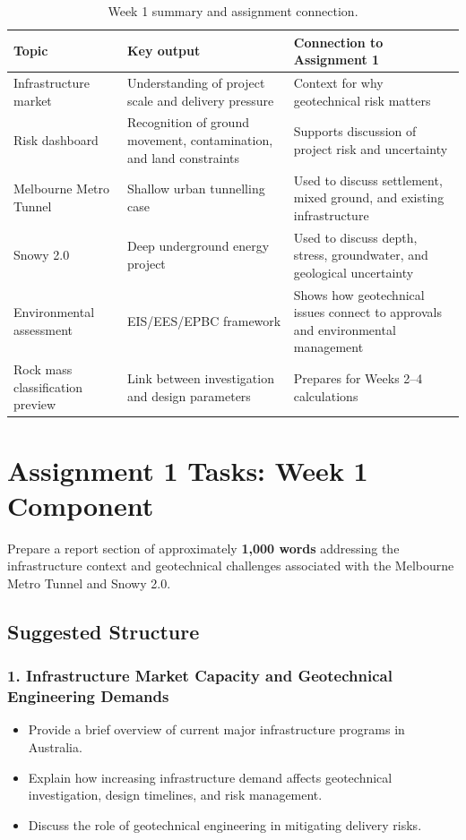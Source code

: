 \documentclass[a4paper,12pt]{article}
\begin{document}
\begin{table}[H]
\centering
\small
\begin{tabularx}{\textwidth}{l X X}
\toprule
\textbf{Topic} & \textbf{Key output} & \textbf{Connection to Assignment 1} \\
\midrule
Infrastructure market & Understanding of project scale and delivery pressure & Context for why geotechnical risk matters \\
Risk dashboard & Recognition of ground movement, contamination, and land constraints & Supports discussion of project risk and uncertainty \\
Melbourne Metro Tunnel & Shallow urban tunnelling case & Used to discuss settlement, mixed ground, and existing infrastructure \\
Snowy 2.0 & Deep underground energy project & Used to discuss depth, stress, groundwater, and geological uncertainty \\
Environmental assessment & EIS/EES/EPBC framework & Shows how geotechnical issues connect to approvals and environmental management \\
Rock mass classification preview & Link between investigation and design parameters & Prepares for Weeks 2--4 calculations \\
\bottomrule
\end{tabularx}
\caption{Week 1 summary and assignment connection.}
\end{table}

\section{Assignment 1 Tasks: Week 1 Component}

\begin{assignmentbox}
Prepare a report section of approximately \textbf{1,000 words} addressing the infrastructure context and geotechnical challenges associated with the Melbourne Metro Tunnel and Snowy 2.0.
\end{assignmentbox}

\subsection{Suggested Structure}

\subsubsection*{1. Infrastructure Market Capacity and Geotechnical Engineering Demands}
\begin{itemize}
    \item Provide a brief overview of current major infrastructure programs in Australia.
    \item Explain how increasing infrastructure demand affects geotechnical investigation, design timelines, and risk management.
    \item Discuss the role of geotechnical engineering in mitigating delivery risks.
\end{itemize}
\end{document}

